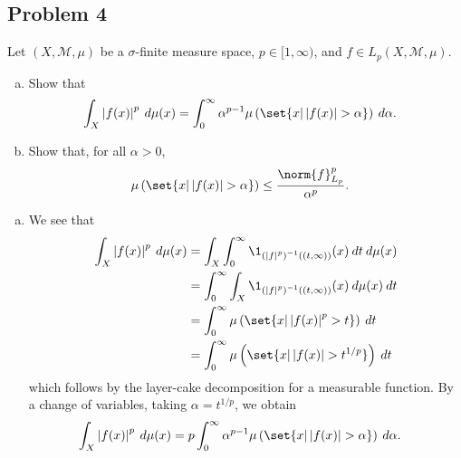 \documentclass[10pt]{mypackage}
\begin{document}
\subsection{Problem 4}%
\begin{problem}
  Let $\left( X,\mathcal{M},\mu \right)$ be a $\sigma$-finite measure space, $p\in [1,\infty)$, and $f\in L_p\left( X,\mathcal{M},\mu \right)$.
  \begin{enumerate}[(a)]
    \item Show that
      \begin{align*}
        \int_{X}^{} \left\vert f(x) \right\vert^{p}\:d\mu(x) &= \int_{0}^{\infty} \alpha^{p-1} \mu\left( \set{x | \left\vert f(x) \right\vert > \alpha} \right)\:d\alpha.
      \end{align*}
    \item Show that, for all $\alpha > 0$,
      \begin{align*}
        \mu\left( \set{x | \left\vert f(x) \right\vert > \alpha} \right) &\leq \frac{\norm{f}_{L_p}^{p}}{\alpha^{p}}.
      \end{align*}
  \end{enumerate}
\end{problem}
\begin{enumerate}[(a)]
  \item We see that
    \begin{align*}
      \int_{X}^{} \left\vert f(x) \right\vert^{p}\:d\mu(x) &= \int_{X}^{} \int_{0}^{\infty} \1_{\left( \left\vert f \right\vert^{p} \right)^{-1}\left( \left( t,\infty \right) \right)}(x)\:dt\:d\mu(x)\\
                                                           &= \int_{0}^{\infty} \int_{X}^{} \1_{\left( \left\vert f \right\vert^{p} \right)^{-1}\left( \left( t,\infty \right) \right)}(x)\:d\mu(x)\:dt\\
                                                           &= \int_{0}^{\infty} \mu\left( \set{x | \left\vert f(x) \right\vert^{p} > t} \right)\:dt\\
                                                           &= \int_{0}^{\infty} \mu\left( \set{x | \left\vert f(x) \right\vert > t^{1/p}} \right)\:dt
    \end{align*}
    which follows by the layer-cake decomposition for a measurable function. By a change of variables, taking $\alpha = t^{1/p}$, we obtain
    \begin{align*}
      \int_{X}^{} \left\vert f(x) \right\vert^{p}\:d\mu(x) &= p \int_{0}^{\infty} \alpha^{p-1}\mu\left( \set{x | \left\vert f(x) \right\vert > \alpha} \right)\:d\alpha.
    \end{align*}
    
\end{enumerate}
\end{document}
